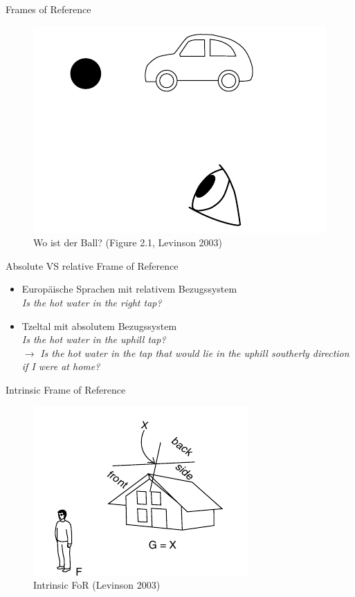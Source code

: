 \documentclass[12pt,a4paper]{beamer}
\begin{document}
\begin{frame}{Frames of Reference}

\begin{figure}
\includegraphics[scale=0.45]{img/levinson_fig_2-1.png}
\caption{Wo ist der Ball? (Figure 2.1, Levinson 2003)}
\end{figure}
\end{frame}


\begin{frame}{Absolute VS relative Frame of Reference}
\begin{itemize}
\item Europäische Sprachen mit relativem Bezugssystem \\
\textit{Is the hot water in the right tap?}
\item Tzeltal mit absolutem Bezugssystem \\
\textit{Is the hot water in the uphill tap?} \\
$\to$ \textit{Is the hot water in the tap that would lie in the uphill southerly direction if I were at home?}
\end{itemize}
\end{frame}



\begin{frame}{Intrinsic Frame of Reference}
\begin{figure}
\includegraphics[scale=0.45]{img/levinson_FOR_intrinsic.png}
\caption{Intrinsic FoR (Levinson 2003)}
\end{figure}
\end{frame}
\end{document}

